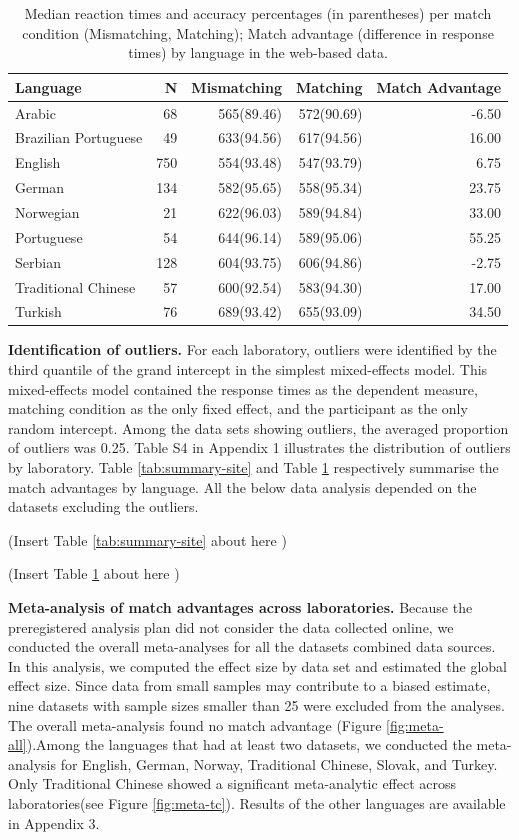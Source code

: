\documentclass[
  man]{apa6}
\begin{document}
\begin{table}

\caption{\label{tab:summary-osweb}Median reaction times and accuracy percentages (in parentheses) per match condition (Mismatching, Matching); Match advantage (difference in response times) by language in the web-based data.}
\centering
\begin{tabular}[t]{lrrrr}
\toprule
Language & N & Mismatching & Matching & Match Advantage\\
\midrule
Arabic & 68 & 565(89.46) & 572(90.69) & -6.50\\
Brazilian Portuguese & 49 & 633(94.56) & 617(94.56) & 16.00\\
English & 750 & 554(93.48) & 547(93.79) & 6.75\\
German & 134 & 582(95.65) & 558(95.34) & 23.75\\
Norwegian & 21 & 622(96.03) & 589(94.84) & 33.00\\
\addlinespace
Portuguese & 54 & 644(96.14) & 589(95.06) & 55.25\\
Serbian & 128 & 604(93.75) & 606(94.86) & -2.75\\
Traditional Chinese & 57 & 600(92.54) & 583(94.30) & 17.00\\
Turkish & 76 & 689(93.42) & 655(93.09) & 34.50\\
\bottomrule
\end{tabular}
\end{table}

\textbf{Identification of outliers.} For each laboratory, outliers were identified by the third quantile of the grand intercept in the simplest mixed-effects model. This mixed-effects model contained the response times as the dependent measure, matching condition as the only fixed effect, and the participant as the only random intercept. Among the data sets showing outliers, the averaged proportion of outliers was 0.25. Table S4 in Appendix 1 illustrates the distribution of outliers by laboratory. Table \ref{tab:summary-site} and Table \ref{tab:summary-osweb} respectively summarise the match advantages by language. All the below data analysis depended on the datasets excluding the outliers.

(Insert Table \ref{tab:summary-site} about here )

(Insert Table \ref{tab:summary-osweb} about here )

\textbf{Meta-analysis of match advantages across laboratories.} Because the preregistered analysis plan did not consider the data collected online, we conducted the overall meta-analyses for all the datasets combined data sources. In this analysis, we computed the effect size by data set and estimated the global effect size. Since data from small samples may contribute to a biased estimate, nine datasets with sample sizes smaller than 25 were excluded from the analyses. The overall meta-analysis found no match advantage (Figure \ref{fig:meta-all}).Among the languages that had at least two datasets, we conducted the meta-analysis for English, German, Norway, Traditional Chinese, Slovak, and Turkey. Only Traditional Chinese showed a significant meta-analytic effect across laboratories(see Figure \ref{fig:meta-tc}). Results of the other languages are available in Appendix 3.
\end{document}
